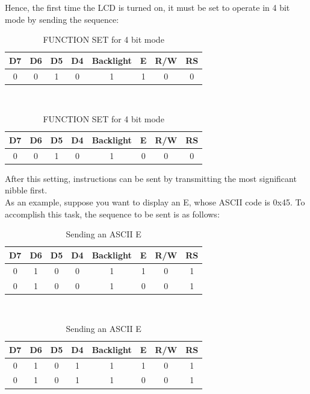 \documentclass[a4paper, 12pt]{article}
\begin{document}
Hence, the first time the LCD is turned on, it must be set to operate in 4 bit mode by sending the sequence:
\begin{table}[h]
    \centering
    \begin{tabular}{ | c | c | c | c | c | c | c | c | } 
        \hline
        D7 & D6 & D5 & D4 & Backlight & E & R/W & RS \\ [0.4ex] 
        \hline
        0 & 0 & 1 & 0 & 1 & 1 & 0 & 0 \\
        \hline
    \end{tabular}
    \\ [0.3cm] 
    \begin{tabular}{ | c | c | c | c | c | c | c | c | } 
        \hline
        D7 & D6 & D5 & D4 & Backlight & E & R/W & RS \\ [0.4ex] 
        \hline
        0 & 0 & 1 & 0 & 1 & 0 & 0 & 0 \\
        \hline
    \end{tabular}
    \caption{FUNCTION SET for 4 bit mode}
\end{table}

After this setting, instructions can be sent by transmitting the most significant nibble first. \\
As an example, suppose you want to display an E, whose ASCII code is 0x45. To accomplish this task, the sequence to be sent is as follows:
\begin{table}[h]
    \centering
    \begin{tabular}{ | c | c | c | c | c | c | c | c | } 
        \hline
        D7 & D6 & D5 & D4 & Backlight & E & R/W & RS \\ [0.4ex] 
        \hline
        0 & 1 & 0 & 0 & 1 & 1 & 0 & 1 \\
        \hline
        0 & 1 & 0 & 0 & 1 & 0 & 0 & 1 \\
        \hline
    \end{tabular}
    \\ [0.3cm] 
    \begin{tabular}{ | c | c | c | c | c | c | c | c | } 
        \hline
        D7 & D6 & D5 & D4 & Backlight & E & R/W & RS \\ [0.4ex] 
        \hline
        0 & 1 & 0 & 1 & 1 & 1 & 0 & 1 \\
        \hline
        0 & 1 & 0 & 1 & 1 & 0 & 0 & 1 \\
        \hline
    \end{tabular}
    \caption{Sending an ASCII E}
\end{table}
\end{document}
